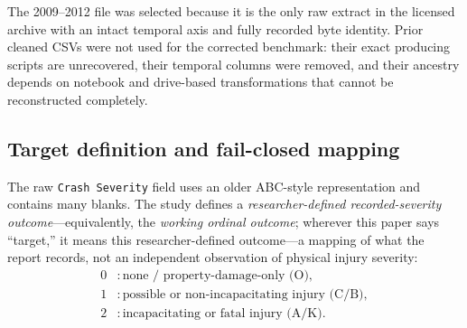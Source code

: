\documentclass[11pt,letterpaper]{article}
\begin{document}
The 2009--2012 file was selected because it is the only raw extract in the licensed archive with an intact temporal axis and fully recorded byte identity. Prior cleaned CSVs were not used for the corrected benchmark: their exact producing scripts are unrecovered, their temporal columns were removed, and their ancestry depends on notebook and drive-based transformations that cannot be reconstructed completely.

\subsection{Target definition and fail-closed mapping}
The raw \texttt{Crash Severity} field uses an older ABC-style representation and contains many blanks. The study defines a \emph{researcher-defined recorded-severity outcome}---equivalently, the \emph{working ordinal outcome}; wherever this paper says ``target,'' it means this researcher-defined outcome---a mapping of what the report records, not an independent observation of physical injury severity:
\begin{align*}
0 &: \text{none / property-damage-only (O)},\\
1 &: \text{possible or non-incapacitating injury (C/B)},\\
2 &: \text{incapacitating or fatal injury (A/K)}.
\end{align*}
\end{document}
